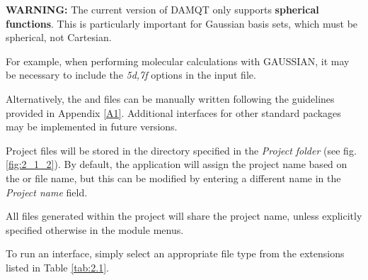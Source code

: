 \documentclass[10pt]{article}
\begin{document}
{\bf WARNING:} The current version of DAMQT only supports {\bf spherical functions}.
This is particularly important for Gaussian basis sets, which must be spherical,
not Cartesian.

For example, when performing molecular calculations with GAUSSIAN,
it may be necessary to include the {\it 5d,7f} options in the input file.

Alternatively, the \ggbs{ } and \den{ } files can be manually written
following the guidelines provided in Appendix \ref{A1}.
Additional interfaces for other standard packages may be implemented in future versions.

Project files will be stored in the directory specified in the {\it Project folder}
(see fig. \ref{fig:2_1_2}). By default, the application will assign the project name
based on the \ggbs{ } or \sgbs{ } file name,
but this can be modified by entering a different name in the {\it Project name} field.

All files generated within the project will share the project name,
unless explicitly specified otherwise in the module menus.

To run an interface, simply select an appropriate file type
from the extensions listed in Table \ref{tab:2.1}.
 
\end{document}
